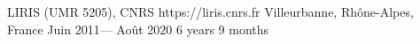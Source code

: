 \jobcompany%
{LIRIS (UMR 5205), CNRS}%
{https://liris.cnrs.fr}%
{Villeurbanne, Rhône-Alpes, France}%
{Juin 2011--- Août 2020}%
{6 years 9 months}
{}
